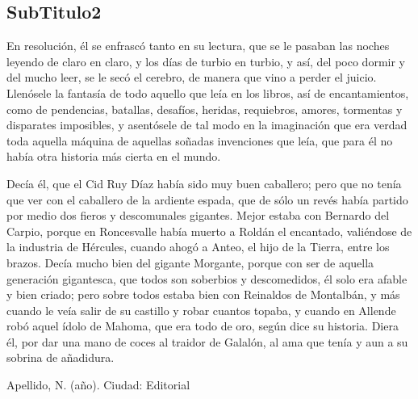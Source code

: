 \subsection{SubTitulo2}
 En resolución, él se enfrascó tanto en su lectura, que se le pasaban las noches leyendo de claro en claro, y los días de turbio en turbio, y así, del poco dormir y del mucho leer, se le secó el cerebro, de manera que vino a perder el juicio. Llenósele la fantasía de todo aquello que leía en los libros, así de encantamientos, como de pendencias, batallas, desafíos, heridas, requiebros, amores, tormentas y disparates imposibles, y asentósele de tal modo en la imaginación que era verdad toda aquella máquina de aquellas soñadas invenciones que leía, que para él no había otra historia más cierta en el mundo.

Decía él, que el Cid Ruy Díaz había sido muy buen caballero; pero que no tenía que ver con el caballero de la ardiente espada, que de sólo un revés había partido por medio dos fieros y descomunales gigantes. Mejor estaba con Bernardo del Carpio, porque en Roncesvalle había muerto a Roldán el encantado, valiéndose de la industria de Hércules, cuando ahogó a Anteo, el hijo de la Tierra, entre los brazos. Decía mucho bien del gigante Morgante, porque con ser de aquella generación gigantesca, que todos son soberbios y descomedidos, él solo era afable y bien criado; pero sobre todos estaba bien con Reinaldos de Montalbán, y más cuando le veía salir de su castillo y robar cuantos topaba, y cuando en Allende robó aquel ídolo de Mahoma, que era todo de oro, según dice su historia. Diera él, por dar una mano de coces al traidor de Galalón, al ama que tenía y aun a su sobrina de añadidura.


\begin{thebibliography}{9}
 Apellido, N. (año).
\newblock Ciudad:
\newblock Editorial
\end{thebibliography}


